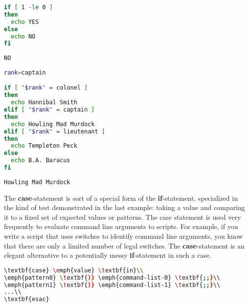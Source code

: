 \lstset{basicstyle=\scriptsize, numbers=left, captionpos=b, tabsize=4}
\begin{lstlisting}[caption=Example of an if statement with an else clause,language={bash},
breaklines=true,xleftmargin=15pt,label=lst:Example of an if statement with an else clause]
if [ 1 -le 0 ]
then
  echo YES
else
  echo NO
fi
\end{lstlisting}

\scriptsize
\begin{verbatim}
NO
\end{verbatim}
\normalsize


\lstset{basicstyle=\scriptsize, numbers=left, captionpos=b, tabsize=4}
\begin{lstlisting}[caption=Example of a full if statement with an else clause and two elifs,language={bash},
breaklines=true,xleftmargin=15pt,label=lst:Example of a full if statement with an else clause and two elifs]
rank=captain

if [ "$rank" = colonel ]
then
  echo Hannibal Smith
elif [ "$rank" = captain ]
then
  echo Howling Mad Murdock
elif [ "$rank" = lieutenant ]
then
  echo Templeton Peck
else
  echo B.A. Baracus
fi
\end{lstlisting}

\scriptsize
\begin{verbatim}
Howling Mad Murdock
\end{verbatim}
\normalsize

The \textbf{case}-statement is sort of a special form of the
\textbf{if}-statement, specialized in the kind of test demonstrated in the last
example: taking a value and comparing it to a fixed set of expected values or
patterns. The case statement is used very frequently to evaluate command line
arguments to scripts. For example, if you write a script that uses switches to
identify command line arguments, you know that there are only a limited number
of legal switches. The \textbf{case}-statement is an elegant alternative to a
potentially messy \textbf{if}-statement in such a case.


\lstset{basicstyle=\scriptsize, numbers=left, captionpos=b, tabsize=4}
\begin{lstlisting}[caption=The general form of the case statement is,language={bash},
breaklines=true,xleftmargin=15pt,label=lst:The general form of the case statement is]
\textbf{case} \emph{value} \textbf{in}\\
\emph{pattern0} \textbf{)} \emph{command-list-0} \textbf{;;}\\
\emph{pattern1} \textbf{)} \emph{command-list-1} \textbf{;;}\\
...\\
\textbf{esac}
\end{lstlisting}

